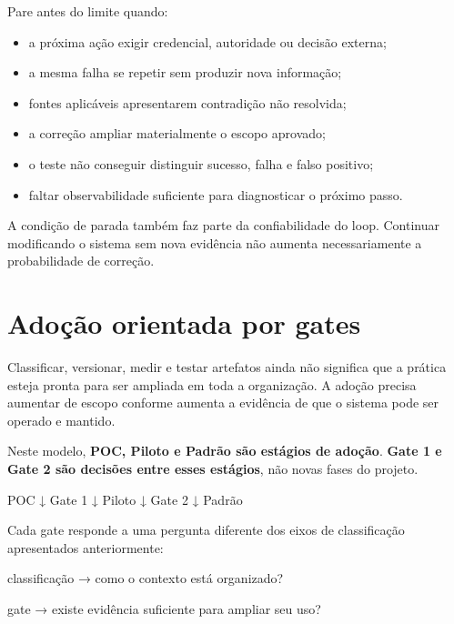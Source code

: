 \documentclass[
  10pt,
  a4paper,
  oneside]{book}
\newenvironment{Shaded}{}{}
\newcommand{\NormalTok}[1]{#1}
\providecommand{\tightlist}{%
  \setlength{\itemsep}{0pt}\setlength{\parskip}{0pt}}
\renewenvironment{Shaded}{\begin{snugshade}}{\end{snugshade}}%
\begin{document}
Pare antes do limite quando:

\begin{itemize}
\tightlist
\item
  a próxima ação exigir credencial, autoridade ou decisão externa;
\item
  a mesma falha se repetir sem produzir nova informação;
\item
  fontes aplicáveis apresentarem contradição não resolvida;
\item
  a correção ampliar materialmente o escopo aprovado;
\item
  o teste não conseguir distinguir sucesso, falha e falso positivo;
\item
  faltar observabilidade suficiente para diagnosticar o próximo passo.
\end{itemize}

A condição de parada também faz parte da confiabilidade do loop.
Continuar modificando o sistema sem nova evidência não aumenta
necessariamente a probabilidade de correção.

\hypertarget{adouxe7uxe3o-orientada-por-gates}{%
\section{Adoção orientada por
gates}\label{adouxe7uxe3o-orientada-por-gates}}

Classificar, versionar, medir e testar artefatos ainda não significa que
a prática esteja pronta para ser ampliada em toda a organização. A
adoção precisa aumentar de escopo conforme aumenta a evidência de que o
sistema pode ser operado e mantido.

Neste modelo, \textbf{POC, Piloto e Padrão são estágios de adoção}.
\textbf{Gate 1 e Gate 2 são decisões entre esses estágios}, não novas
fases do projeto.

\begin{Shaded}
\begin{Highlighting}[]
\NormalTok{POC}
\NormalTok{ ↓}
\NormalTok{Gate 1}
\NormalTok{ ↓}
\NormalTok{Piloto}
\NormalTok{ ↓}
\NormalTok{Gate 2}
\NormalTok{ ↓}
\NormalTok{Padrão}
\end{Highlighting}
\end{Shaded}

Cada gate responde a uma pergunta diferente dos eixos de classificação
apresentados anteriormente:

\begin{Shaded}
\begin{Highlighting}[]
\NormalTok{classificação}
\NormalTok{→ como o contexto está organizado?}

\NormalTok{gate}
\NormalTok{→ existe evidência suficiente para ampliar seu uso?}
\end{Highlighting}
\end{Shaded}
\end{document}
